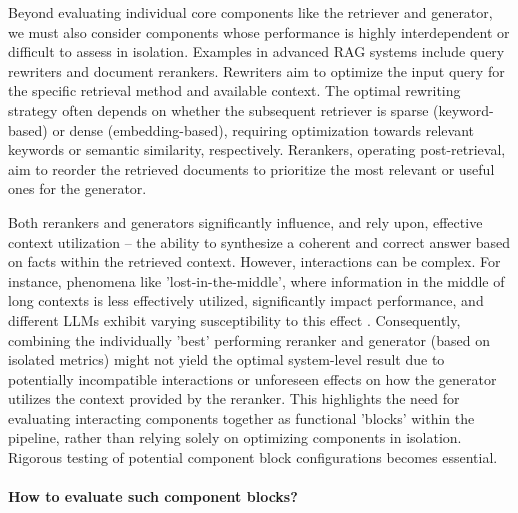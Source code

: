 Beyond evaluating individual core components like the retriever and generator, we must also consider components whose performance is highly interdependent or difficult to assess in isolation. Examples in advanced RAG systems include query rewriters and document rerankers. Rewriters aim to optimize the input query for the specific retrieval method and available context. The optimal rewriting strategy often depends on whether the subsequent retriever is sparse (keyword-based) or dense (embedding-based), requiring optimization towards relevant keywords or semantic similarity, respectively. Rerankers, operating post-retrieval, aim to reorder the retrieved documents to prioritize the most relevant or useful ones for the generator.

Both rerankers and generators significantly influence, and rely upon, effective context utilization – the ability to synthesize a coherent and correct answer based on facts within the retrieved context. However, interactions can be complex. For instance, phenomena like 'lost-in-the-middle', where information in the middle of long contexts is less effectively utilized, significantly impact performance, and different LLMs exhibit varying susceptibility to this effect \cite{Liu.06.07.2023}. Consequently, combining the individually 'best' performing reranker and generator (based on isolated metrics) might not yield the optimal system-level result due to potentially incompatible interactions or unforeseen effects on how the generator utilizes the context provided by the reranker. This highlights the need for evaluating interacting components together as functional 'blocks' within the pipeline, rather than relying solely on optimizing components in isolation. Rigorous testing of potential component block configurations becomes essential.

\paragraph{How to evaluate such component blocks?}


